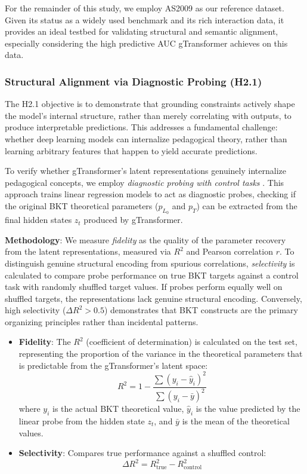 \documentclass[applsci,article,submit,moreauthors,pdftex]{Definitions/mdpi}
\begin{document}
For the remainder of this study, we employ AS2009 as our reference dataset. Given its status as a widely used benchmark and its rich interaction data, it provides an ideal testbed for validating structural and semantic alignment, especially considering the high predictive AUC gTransformer achieves on this data.

\subsubsection{Structural Alignment via Diagnostic Probing (H2.1)} \label{sec_structural_alignment}

The H2.1 objective is to demonstrate that grounding constraints actively shape the model's internal structure, rather than merely correlating with outputs, to produce interpretable predictions. This addresses a fundamental challenge: whether deep learning models can internalize pedagogical theory, rather than learning arbitrary features that happen to yield accurate predictions. 

To verify whether gTransformer's latent representations genuinely internalize pedagogical concepts, we employ \textit{diagnostic probing with control tasks} \citep{hewitt2019designing, belinkov2022probing}. This approach trains linear regression models to act as diagnostic probes, checking if the original BKT theoretical parameters ($p_{L_0}$ and $p_{T}$) can be extracted from the final hidden states $z_t$ produced by gTransformer. 

\textbf{Methodology}: We measure \textit{fidelity} as the quality of the parameter recovery from the latent representations, measured via $R^2$ and Pearson correlation $r$. To distinguish genuine structural encoding from spurious correlations, \textit{selectivity} is calculated to compare probe performance on true BKT targets against a control task with randomly shuffled target values. If probes perform equally well on shuffled targets, the representations lack genuine structural encoding. Conversely, high selectivity ($\Delta R^2 > 0.5$) demonstrates that BKT constructs are the primary organizing principles rather than incidental patterns. 

\begin{itemize}
    \item \textbf{Fidelity}: The $R^2$ (coefficient of determination) is calculated on the test set, representing the proportion of the variance in the theoretical parameters that is predictable from the gTransformer's latent space:
    \[ R^2 = 1 - \frac{\sum (y_i - \hat{y}_i)^2}{\sum (y_i - \bar{y})^2} \]
    where $y_i$ is the actual BKT theoretical value, $\hat{y}_i$ is the value predicted by the linear probe from the hidden state $z_t$, and $\bar{y}$ is the mean of the theoretical values.
    \item \textbf{Selectivity}: Compares true performance against a shuffled control:
    \[ \Delta R^2 = R^2_{\text{true}} - R^2_{\text{control}} \]
\end{itemize}
\end{document}
